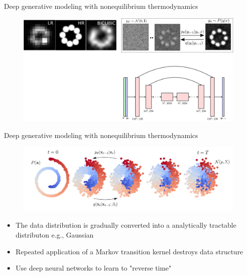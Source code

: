 \documentclass{beamer}					%
\begin{document}
\begin{frame}{Deep generative modeling with nonequilibrium thermodynamics}
\begin{figure}
\includegraphics[width=12cm]{Diffusion.png}
\end{figure}
\end{frame}


\begin{frame}{Deep generative modeling with nonequilibrium thermodynamics}
\begin{figure}
\includegraphics[width=12cm]{DiffusionSwiss.png}
\end{figure}
\begin{itemize}
\item The data distribution is gradually converted into a analytically tractable distributon e.g., Gaussian
\item Repeated application of a Markov transition kernel destroys data structure
\item Use deep neural networks to learn to "reverse time"
\end{itemize}
\end{frame}
\end{document}
